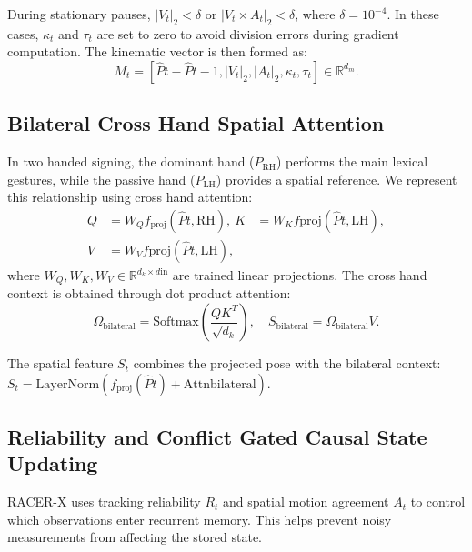 \documentclass[conference]{IEEEtran}
\begin{document}
During stationary pauses, $|V_t|_2 < \delta$ or $|V_t \times A_t|_2 < \delta$, where $\delta = 10^{-4}$. In these cases, $\kappa_t$ and $\tau_t$ are set to zero to avoid division errors during gradient computation. The kinematic vector is then formed as:
\begin{equation}
M_t = \left[ \hat{P}t - \hat{P}{t-1}, |V_t|_2, |A_t|_2, \kappa_t, \tau_t \right] \in \mathbb{R}^{d_m}.
\label{eq:motion_descriptor}
\end{equation}

\subsection{Bilateral Cross Hand Spatial Attention}

In two handed signing, the dominant hand ($P_{\text{RH}}$) performs the main lexical gestures, while the passive hand ($P_{\text{LH}}$) provides a spatial reference. We represent this relationship using cross hand attention:
\begin{equation}
\begin{aligned}
Q &= W_Q f_{\text{proj}}(\hat{P}{t, \text{RH}}), \
K &= W_K f{\text{proj}}(\hat{P}{t, \text{LH}}), \\
V &= W_V f{\text{proj}}(\hat{P}{t, \text{LH}}),
\end{aligned}
\label{eq:bilateral_qkv}
\end{equation}
where $W_Q, W_K, W_V \in \mathbb{R}^{d_k \times d{\text{in}}}$ are trained linear projections. The cross hand context is obtained through dot product attention:
\begin{equation}
\Omega_{\text{bilateral}} = \text{Softmax}\left(\frac{Q K^T}{\sqrt{d_k}}\right), \quad S_{\text{bilateral}} = \Omega_{\text{bilateral}} V.
\label{eq:bilateral_math}
\end{equation}

The spatial feature $S_t$ combines the projected pose with the bilateral context:
$S_t = \text{LayerNorm}(f_{\text{proj}}(\hat{P}t) + \text{Attn}{\text{bilateral}})$.

\subsection{Reliability and Conflict Gated Causal State Updating}

RACER-X uses tracking reliability $R_t$ and spatial motion agreement $A_t$ to control which observations enter recurrent memory. This helps prevent noisy measurements from affecting the stored state.
\end{document}

